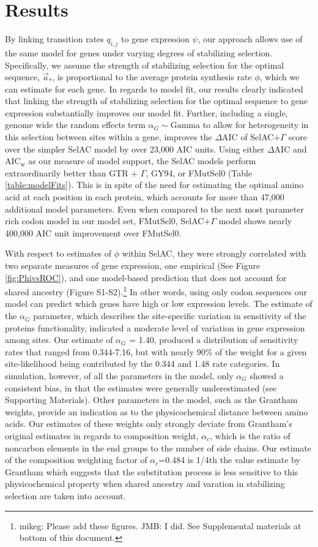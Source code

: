 \documentclass{article}
\newcommand{\DeltaAIC}{\ensuremath{\Delta\text{AIC}}\xspace}
\newcommand{\AICw}{\ensuremath{\text{AIC}_\text{w}}\xspace}
\newcommand{\selac}{SelAC\xspace}
\newcommand{\selacplusgamma}{SelAC$+\Gamma$\xspace}
\newcommand{\alphac}{\ensuremath{\alpha_c}\xspace}
\newcommand{\alphag}{\ensuremath{\alpha_G}\xspace}
\newcommand{\aoptvec}{\ensuremath{\Vec{a}_*}\xspace}
\newcommand{\qij}{\ensuremath{q_{i,j}}\xspace}
\begin{document}
\section*{Results}
By linking transition rates $\qij$ to gene expression $\psi$, our approach allows use of the same model for genes under varying degrees of stabilizing selection.
Specifically, we assume the strength of stabilizing selection for the optimal sequence, \aoptvec, is proportional to the average protein synthesis rate $\phi$, which we can estimate for each gene. 
In regards to model fit, our results clearly indicated that linking the strength of stabilizing selection for the optimal sequence to gene expression substantially improves our model fit.
Further, including a single, genome wide the random effects term $\alphag \sim \text{Gamma}$ to allow for heterogeneity in this selection between sites within a gene, improves the \DeltaAIC of \selacplusgamma score over the simpler \selac model by over 23,000 AIC units.
Using either \DeltaAIC and \AICw as our measure of model support, the SelAC models perform extraordinarily better than GTR + $\Gamma$, GY94, or FMutSel0 (Table \ref{table:modelFits}).
This is in spite of the need for estimating the optimal amino acid at each position in each protein, which accounts for  more than 47,000 additional model parameters.
Even when compared to the next most parameter rich codon model in our model set, FMutSel0, \selacplusgamma model shows nearly 400,000 AIC unit improvement over FMutSel0.

With respect to estimates of $\phi$ within SelAC, they were strongly correlated with two separate measures of gene expression, one empirical (See Figure \ref{fig:PhivsROC}), and one model-based prediction that does not account for shared ancestry (Figure S1-S2).\footnote{mikeg: Please add these figures. JMB: I did. See Supplemental materials at bottom of this document.}
In other words, using only codon sequences our model can predict which genes have high or low expression levels.
The estimate of the $\alphag$ parameter, which describes the site-specific variation in sensitivity of the proteins functionality, indicated a moderate level of variation in gene expression among sites.
Our estimate of $\alphag$ = 1.40, produced a distribution of sensitivity rates that ranged from 0.344-7.16, but with nearly 90\% of the weight for a given site-likelihood being contributed by the 0.344 and 1.48 rate categories.
In simulation, however, of all the parameters in the model, only $\alphag$ showed a consistent bias, in that the estimates were generally underestimated (see Supporting Materials).
Other parameters in the model, such as the Grantham weights, provide an indication as to the physicochemical distance between amino acids.
Our estimates of these weights only strongly deviate from Grantham's \citeyear{Grantham1974} original estimates in regards to composition weight, $\alphac$, which is the ratio of noncarbon elements in the end groups to the number of side chains.
Our estimate of the composition weighting factor of $\alphac$=0.484 is 1/4th the value estimate by Grantham which suggests that the substitution process is less sensitive to this physicochemical property when shared ancestry and varation in stabilizing selection are taken into account.
\end{document}

